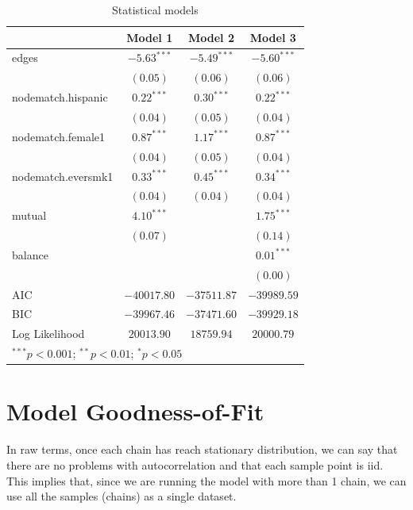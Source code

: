 \documentclass[
]{book}
\begin{document}
\begin{table}
\begin{center}
\begin{tabular}{l c c c}
\hline
 & Model 1 & Model 2 & Model 3 \\
\hline
edges              & $-5.63^{***}$ & $-5.49^{***}$ & $-5.60^{***}$ \\
                   & $(0.05)$      & $(0.06)$      & $(0.06)$      \\
nodematch.hispanic & $0.22^{***}$  & $0.30^{***}$  & $0.22^{***}$  \\
                   & $(0.04)$      & $(0.05)$      & $(0.04)$      \\
nodematch.female1  & $0.87^{***}$  & $1.17^{***}$  & $0.87^{***}$  \\
                   & $(0.04)$      & $(0.05)$      & $(0.04)$      \\
nodematch.eversmk1 & $0.33^{***}$  & $0.45^{***}$  & $0.34^{***}$  \\
                   & $(0.04)$      & $(0.04)$      & $(0.04)$      \\
mutual             & $4.10^{***}$  &               & $1.75^{***}$  \\
                   & $(0.07)$      &               & $(0.14)$      \\
balance            &               &               & $0.01^{***}$  \\
                   &               &               & $(0.00)$      \\
\hline
AIC                & $-40017.80$   & $-37511.87$   & $-39989.59$   \\
BIC                & $-39967.46$   & $-37471.60$   & $-39929.18$   \\
Log Likelihood     & $20013.90$    & $18759.94$    & $20000.79$    \\
\hline
\multicolumn{4}{l}{\scriptsize{$^{***}p<0.001$; $^{**}p<0.01$; $^{*}p<0.05$}}
\end{tabular}
\caption{Statistical models}
\label{table:coefficients}
\end{center}
\end{table}

\hypertarget{model-goodness-of-fit}{%
\section{Model Goodness-of-Fit}\label{model-goodness-of-fit}}

In raw terms, once each chain has reach stationary distribution, we can say that there are no problems with autocorrelation and that each sample point is iid. This implies that, since we are running the model with more than 1 chain, we can use all the samples (chains) as a single dataset.
\end{document}
